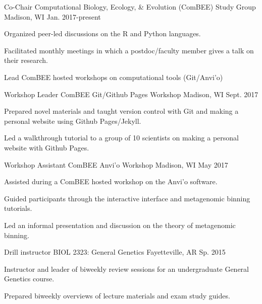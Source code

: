 \begin{cventries}
    \cventry
    {Co-Chair} %
    {Computational Biology, Ecology, \& Evolution (ComBEE) Study Group} %
    {Madison, WI} %
    {Jan. 2017-present} %
    {
      \begin{cvitems} %
        \item {Organized peer-led discussions on the R and Python languages.}
        \item {Facilitated monthly meetings in which a postdoc/faculty member gives a talk on their research.}
        \item {Lead ComBEE hosted workshops on computational tools (Git/Anvi'o)}
      \end{cvitems}
    }
    
  \cventry
    {Workshop Leader} %
    {ComBEE Git/Github Pages Workshop} %
    {Madison, WI} %
    {Sept. 2017} %
    {
      \begin{cvitems} %
        \item {Prepared novel materials and taught version control with Git and making a personal website using Github Pages/Jekyll.}
        \item {Led a walkthrough tutorial to a group of 10 scientists on making a personal website with Github Pages.}
      \end{cvitems}
    }

  \cventry
    {Workshop Assistant} %
    {ComBEE Anvi'o Workshop} %
    {Madison, WI} %
    {May 2017} %
    {
      \begin{cvitems} %
        \item {Assisted during a ComBEE hosted workshop on the Anvi'o software.}
        \item {Guided participants through the interactive interface and metagenomic binning tutorials.}
        \item {Led an informal presentation and discussion on the theory of metagenomic binning.}
      \end{cvitems}
    }

  \cventry
    {Drill instructor} %
    {BIOL 2323: General Genetics} %
    {Fayetteville, AR} %
    {Sp. 2015} %
    {
      \begin{cvitems} %
        \item {Instructor and leader of biweekly review sessions for an undergraduate General Genetics course.}
        \item {Prepared biweekly overviews of lecture materials and exam study guides.}
      \end{cvitems}
    }


\end{cventries}
